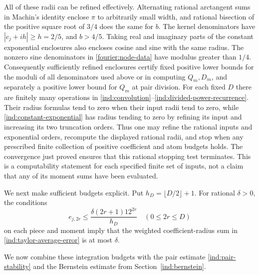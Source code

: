 All of these radii can be refined effectively.  Alternating rational
arctangent sums in Machin's identity enclose $\pi$ to arbitrarily small
width, and rational bisection of the positive square root of $3/4$ does the
same for $b$.  The kernel denominators have $|c_j+ih|\ge h=2/5$, and
$b>4/5$.  Taking real and imaginary parts of the constant exponential
enclosures also encloses cosine and sine with the same radius.  The nonzero
sine denominators in \eqref{fourier:node-data} have modulus greater than
$1/4$.  Consequently sufficiently refined enclosures certify fixed
positive lower bounds for the moduli of all denominators used above or in
computing $Q_m,D_m$, and separately a positive lower bound for $Q_m$ at
pair division.  For each fixed $D$ there are finitely many operations in
\eqref{ind:convolution}--\eqref{ind:divided-power-recurrence}.  Their
radius formulas tend to zero when their input radii tend to zero, while
\eqref{ind:constant-exponential} has radius tending to zero by refining
its input and increasing its two truncation orders.  Thus one may refine
the rational inputs and exponential orders, recompute the displayed
rational radii, and stop when any prescribed finite collection of positive
coefficient and atom budgets holds.  The convergence just proved ensures
that this rational stopping test terminates.  This is a computability
statement for each specified finite set of inputs, not a claim that any
of its moment sums have been evaluated.

We next make sufficient budgets explicit.  Put
$h_D=\lfloor D/2\rfloor+1$.  For rational $\delta>0$, the conditions
\begin{equation}\label{ind:coefficient-budget}
 e_{j,2r}\le \frac{\delta(2r+1)12^{2r}}{h_D}
 \quad(0\le2r\le D)
\end{equation}
on each piece and moment imply that the weighted coefficient-radius sum in
\eqref{ind:taylor-average-error} is at most $\delta$.

We now combine these integration budgets with the pair estimate
\eqref{ind:pair-stability} and the Bernstein estimate from
Section~\ref{ind:bernstein}.

